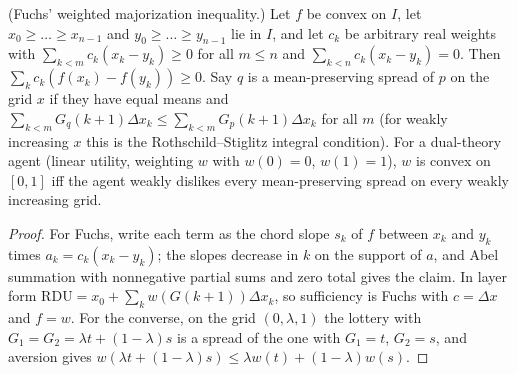 \begin{theorem}
\label{thm:beh-rdu-strong}
\leanok
(Fuchs' weighted majorization inequality.) Let $f$ be convex on $I$, let $x_0\ge\dots\ge x_{n-1}$ and $y_0\ge\dots\ge y_{n-1}$
lie in $I$, and let $c_k$ be arbitrary real weights with $\sum_{k<m}c_k(x_k-y_k)\ge0$ for all $m\le n$ and
$\sum_{k<n}c_k(x_k-y_k)=0$. Then $\sum_k c_k(f(x_k)-f(y_k))\ge0$.
Say $q$ is a mean-preserving spread of $p$ on the grid $x$ if they have equal means and
$\sum_{k<m}G_q(k+1)\Delta x_k\le\sum_{k<m}G_p(k+1)\Delta x_k$ for all $m$ (for weakly increasing $x$ this is the
Rothschild--Stiglitz integral condition). For a dual-theory agent (linear utility, weighting $w$ with $w(0)=0$, $w(1)=1$),
$w$ is convex on $[0,1]$ iff the agent weakly dislikes every mean-preserving spread on every weakly increasing grid.
\end{theorem}
\begin{proof}
\leanok
For Fuchs, write each term as the chord slope $s_k$ of $f$ between $x_k$ and $y_k$ times $a_k=c_k(x_k-y_k)$; the slopes
decrease in $k$ on the support of $a$, and Abel summation with nonnegative partial sums and zero total gives the claim.
In layer form $\mathrm{RDU}=x_0+\sum_k w(G(k+1))\Delta x_k$, so sufficiency is Fuchs with $c=\Delta x$ and $f=w$. For the
converse, on the grid $(0,\lambda,1)$ the lottery with $G_1=G_2=\lambda t+(1-\lambda)s$ is a spread of the one with
$G_1=t$, $G_2=s$, and aversion gives $w(\lambda t+(1-\lambda)s)\le\lambda w(t)+(1-\lambda)w(s)$.
\end{proof}

